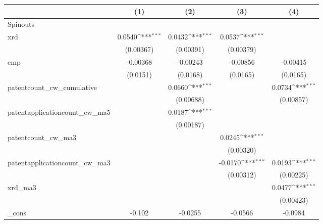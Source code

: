 {
\def\sym#1{\ifmmode^{#1}\else\(^{#1}\)\fi}
\begin{tabular}{l*{4}{c}}
\hline\hline
            &\multicolumn{1}{c}{(1)}         &\multicolumn{1}{c}{(2)}         &\multicolumn{1}{c}{(3)}         &\multicolumn{1}{c}{(4)}         \\
\hline
Spinouts    &                     &                     &                     &                     \\
xrd         &      0.0540\sym{***}&      0.0432\sym{***}&      0.0537\sym{***}&                     \\
            &   (0.00367)         &   (0.00391)         &   (0.00379)         &                     \\
[1em]
emp         &    -0.00368         &    -0.00243         &    -0.00856         &    -0.00415         \\
            &    (0.0151)         &    (0.0168)         &    (0.0165)         &    (0.0165)         \\
[1em]
patentcount\_cw\_cumulative&                     &      0.0660\sym{***}&                     &      0.0734\sym{***}\\
            &                     &   (0.00688)         &                     &   (0.00857)         \\
[1em]
patentapplicationcount\_cw\_ma5&                     &      0.0187\sym{***}&                     &                     \\
            &                     &   (0.00187)         &                     &                     \\
[1em]
patentcount\_cw\_ma3&                     &                     &      0.0245\sym{***}&                     \\
            &                     &                     &   (0.00320)         &                     \\
[1em]
patentapplicationcount\_cw\_ma3&                     &                     &     -0.0170\sym{***}&      0.0193\sym{***}\\
            &                     &                     &   (0.00312)         &   (0.00225)         \\
[1em]
xrd\_ma3     &                     &                     &                     &      0.0477\sym{***}\\
            &                     &                     &                     &   (0.00423)         \\
[1em]
\_cons      &      -0.102         &     -0.0255         &     -0.0566         &     -0.0984         \\

\end{tabular}}
